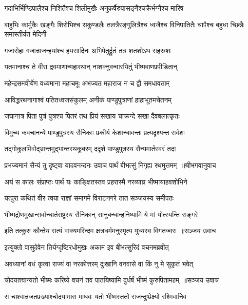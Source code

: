 \twolineshloka
{गदाभिर्भिण्डिपालैश्च निशितैश्च शिलीमुखैः}
{अनुकर्षैरुपासङ्गैश्चक्रैर्भग्नैश्च मारिष}


\threelineshloka
{बाहुभिः कार्मुकैः खङ्गैः शिरोभिश्च सकुण्डलैः}
{तलत्रैरङ्गुलित्रैश्च ध्वजैश्च विनिपातितैः}
{चापैश्च बहुधा च्छिन्नैः समास्तीर्यत मेदिनी}


\twolineshloka
{गजारोहा गजान्राजन्हयांश्च हयसादिनः}
{अभिपेतुर्द्रुतं तत्र शतशोऽथ सहस्रशः}


\twolineshloka
{यतमानाश्च ते वीरा द्रवमाणान्महारथान्}
{नाशक्नुवन्वारयितुं भीष्मबाणप्रपीडितान्}


\twolineshloka
{महेन्द्रसमवीर्येण वध्यमाना महाचमूः}
{अभज्यत महाराज न च द्वौ समधावताम्}


\twolineshloka
{आविद्धरथनागाश्वं पतितध्वजसंकुलम्}
{अनीकं पाण्डुपुत्राणां हाहाभूतमचेतनम्}


\twolineshloka
{जघानात्र पिता पुत्रं पुत्रश्च पितरं तथ}
{प्रियं सखाय चाक्रन्दे सखा दैवबलात्कृतः}


\twolineshloka
{विमुच्य कवचानन्ये पाण्डुपुत्रस्य सैनिकाः}
{प्रकीर्य केशान्धावन्तः प्रत्यदृश्यन्त सर्वशः}


\twolineshloka
{तद्गोकुलमिवोद्भ्रान्तमुद्भान्तरथकूबरम्}
{ददृशे पाण्डुपुत्रस्य सैन्यमार्तस्वरं तदा}


\threelineshloka
{प्रभज्यमानं सैन्यं तु दृष्ट्वा यादवनन्दनः}
{उवाच पार्थं बीभत्सुं निगृह्य रथमुत्तमम् ॥श्रीभगवानुवाच}
{}


\twolineshloka
{अयं स कालः संप्राप्तः पार्थ यः काङ्क्षितस्तव}
{प्रहरास्मै नरव्याघ्र भीष्मायाहवशोभिने}


\twolineshloka
{यत्पुरा कथितं वीर त्वया राज्ञां समागमे}
{विराटनगरे तात सञ्जयस्य समीपतः}


\twolineshloka
{भीष्मद्रोणमुखान्सर्वान्धार्तराष्ट्रस्य सैनिकान्}
{सानुबन्धान्हनिष्यामि ये मां योत्स्यन्ति सङ्गरे}


\threelineshloka
{इति तत्कुरु कौन्तेय सत्यं वाक्यमरिन्दम}
{क्षत्रधर्ममनुस्मृत्य युध्यस्व विगतज्वरः ॥सञ्जय उवाच}
{}


\twolineshloka
{इत्युक्तो वासुदेवेन तिर्यग्दृष्टिरधोमुखः}
{अकाम इव बीभत्सुरिदं वचनमब्रवीत्}


\twolineshloka
{अवध्यानां वधं कृत्वा राज्यं वा नरकोत्तरम्}
{दुःखानि वनवासे वा किं नु मे सुकृतं भवेत्}


\threelineshloka
{चोदयाश्वान्यतो भीष्मः करिष्ये वचनं तव}
{पातयिष्यामि दुर्धर्षं भीष्मं कुरुपितामहम् ॥सञ्जय उवाच}
{}


\threelineshloka
{स चाश्वान्रजतप्रख्यांश्चोदयामास माधवः}
{यतो भीष्मस्ततो राजन्दुष्प्रेक्ष्यो रश्मिवानिव}
{}


